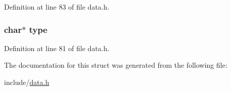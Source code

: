 Definition at line 83 of file data.\+h.

\subsubsection[{\texorpdfstring{type}{type}}]{\setlength{\rightskip}{0pt plus 5cm}char$\ast$ type}\hypertarget{struct_member_a23506fc4821ab6d9671f3e6222591a96}{}\label{struct_member_a23506fc4821ab6d9671f3e6222591a96}


Definition at line 81 of file data.\+h.



The documentation for this struct was generated from the following file\+:\begin{DoxyCompactItemize}
\item 
include/\hyperlink{data_8h}{data.\+h}\end{DoxyCompactItemize}
